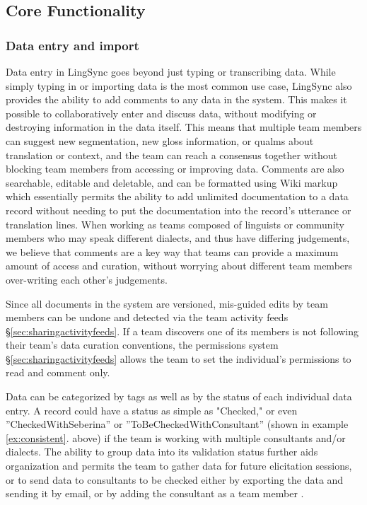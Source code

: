 \documentclass[letterpaper, 12pt, dvips]{mitwpl}
\begin{document}
\subsection{Core Functionality}
\subsubsection{Data entry and import}


Data entry in LingSync goes beyond just typing or transcribing data.
While simply typing in or importing data is the most common use case,
LingSync also provides the ability to add comments to any data in the system.
This makes it possible to collaboratively enter and discuss data,
without modifying or destroying information in the data itself.
This means that multiple team members can suggest new segmentation,
new gloss information,
or qualms about translation or context,
and the team can reach a consensus together without blocking team members from accessing or improving data.
Comments are also searchable, editable and deletable,
and can be formatted using Wiki markup which essentially permits the ability to add unlimited documentation to a data record without needing to put the documentation into the record's utterance or translation lines.
When working as teams composed of linguists or community members who may speak different dialects,
and thus have differing judgements,
we believe that comments are a key way that teams can provide a maximum amount of access and curation,
without worrying about different team members over-writing each other's judgements.


Since all documents in the system are versioned,
mis-guided edits by team members can be undone and detected via the team activity feeds \S \ref{sec:sharingactivityfeeds}.
If a team discovers one of its members is not following their team's data curation conventions,
the permissions system \S \ref{sec:sharingactivityfeeds} allows the team to set the individual's permissions to read and comment only.
 

Data can be categorized by tags as well as by the status of each individual data entry.
A record could have a status as simple as "Checked," or even ''CheckedWithSeberina'' or ''ToBeCheckedWithConsultant'' (shown in example \ref{ex:consistent}. above) if the team is working with multiple consultants and/or dialects.
The ability to group data into its validation status further aids organization and permits the team to gather data for future elicitation sessions,
or to send data to consultants to be checked either by exporting the data and sending it by email,
or by adding the consultant as a team member
 \citep{Schalley:2012}.
\end{document}
